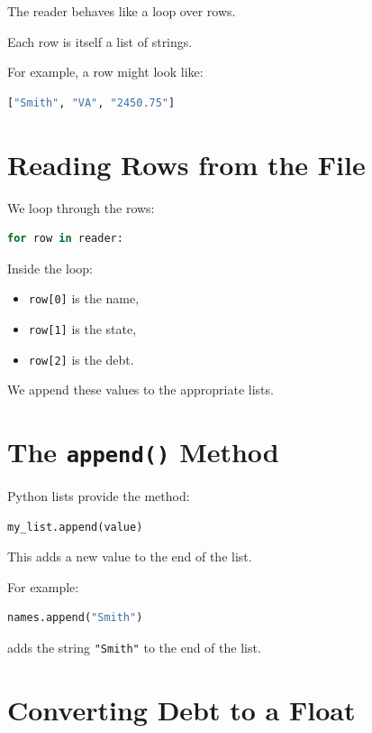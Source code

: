 \documentclass[11pt]{article}
\begin{document}
The reader behaves like a loop over rows.

Each row is itself a list of strings.

For example, a row might look like:

\begin{lstlisting}[language=Python]
["Smith", "VA", "2450.75"]
\end{lstlisting}

\section{Reading Rows from the File}

We loop through the rows:

\begin{lstlisting}[language=Python]
for row in reader:
\end{lstlisting}

Inside the loop:

\begin{itemize}
    \item \texttt{row[0]} is the name,
    \item \texttt{row[1]} is the state,
    \item \texttt{row[2]} is the debt.
\end{itemize}

We append these values to the appropriate lists.

\section{The \texttt{append()} Method}

Python lists provide the method:

\begin{lstlisting}[language=Python]
my_list.append(value)
\end{lstlisting}

This adds a new value to the end of the list.

For example:

\begin{lstlisting}[language=Python]
names.append("Smith")
\end{lstlisting}

adds the string \texttt{"Smith"} to the end of the list.

\section{Converting Debt to a Float}
\end{document}
